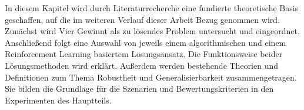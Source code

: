 In diesem Kapitel wird durch Literaturrecherche eine fundierte theoretische Basis geschaffen, auf die im weiteren Verlauf dieser Arbeit Bezug genommen wird. Zunächst wird Vier Gewinnt als zu lösendes Problem untersucht und eingeordnet. Anschließend folgt eine Auswahl von jeweils einem algorithmischen und einem Reinforcement Learning basiertem Lösungsansatz. Die Funktionsweise beider Lösungsmethoden wird erklärt. Außerdem werden bestehende Theorien und Definitionen zum Thema Robustheit und Generalisierbarkeit zusammengetragen. Sie bilden die Grundlage für die Szenarien und Bewertungskriterien in den Experimenten des Hauptteils.